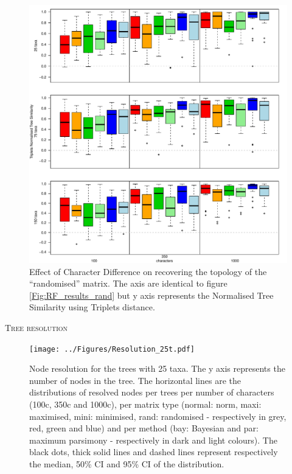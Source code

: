 \documentclass[12pt,letterpaper]{article}
\renewcommand{\section}[1]{%
\bigskip
\begin{center}
\begin{Large}
\normalfont\scshape #1
\medskip
\end{Large}
\end{center}}
\begin{document}
\begin{figure}[!htbp]
\centering
   \includegraphics[width=1\textwidth]{../Figures/Tr_results_null.pdf}
\caption{Effect of Character Difference on recovering the topology of the ``randomised'' matrix. The axis are identical to figure \ref{Fig:RF_results_rand} but y axis represents the Normalised Tree Similarity using Triplets distance.}
\label{Fig:Tr_results_rand}
\end{figure}

\newpage

\section{Tree resolution}

\begin{figure}[!htbp]
\centering
   \texttt{[image: ../Figures/Resolution\_25t.pdf]}
\caption{Node resolution for the trees with 25 taxa. The y axis represents the number of nodes in the tree. The horizontal lines are the distributions of resolved nodes per trees per number of characters (100c, 350c and 1000c), per matrix type (normal: norm, maxi: maximised, mini: minimised, rand: randomised - respectively in grey, red, green and blue) and per method (bay: Bayesian and par: maximum parsimony - respectively in dark and light colours). The black dots, thick solid lines and dashed lines represent respectively the median, 50\% CI and 95\% CI of the distribution.}
\label{Fig:Resolution_25t}
\end{figure}
\end{document}
